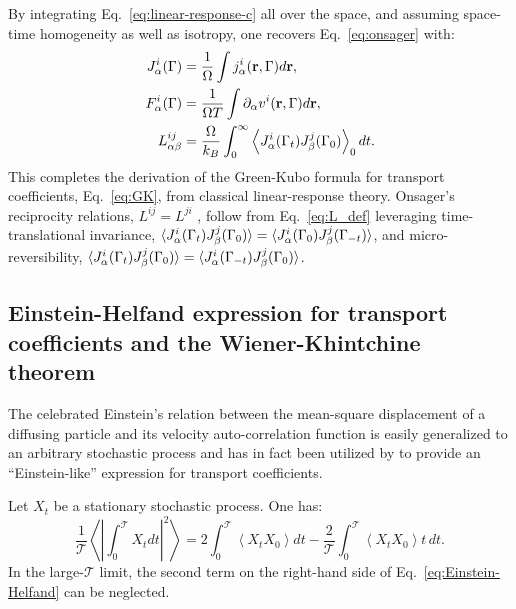 By integrating Eq.~\eqref{eq:linear-response-c} all over the space, and assuming space-time homogeneity as well as isotropy, one recovers Eq.~\eqref{eq:onsager} with:
\begin{align}
J^i_\alpha(\rGamma) &= \frac{1}{\rOmega} \int j^i_\alpha(\mathbf{r},\rGamma) d\mathbf{r}, \label{eq:J_def}\\
F^i_\alpha(\rGamma) &= \frac{1}{\rOmega T} \int \partial_\alpha v^i(\mathbf{r},\rGamma) d\mathbf{r}, \label{eq:F_def}\\
L^{ij}_{\alpha\beta} &= \frac{\rOmega}{k_B} \int_0^\infty \left\langle J^i_\alpha(\rGamma_t) J^j_\beta(\rGamma_0)\right\rangle_0 dt. \label{eq:L_def}
\end{align}
This completes the derivation of the Green-Kubo formula for transport coefficients, Eq.~\eqref{eq:GK}, from classical linear-response theory. Onsager's reciprocity relations, $L^{ij}=L^{ji}$ \citep{Onsager1931a,Onsager1931b}, follow from Eq.~\eqref{eq:L_def} leveraging time-translational invariance, $\langle J^i_\alpha({\mathrm\Gamma}_t) J^j_\beta({\mathrm\Gamma}_0) \rangle = \langle J^i_\alpha({\mathrm\Gamma}_0) J^j_\beta({\mathrm\Gamma}_{-t}) \rangle$, and micro-reversibility, $\langle J^i_\alpha({\mathrm\Gamma}_t) J^j_\beta({\mathrm\Gamma}_0) \rangle = \langle J^i_\alpha({\mathrm\Gamma}_{-t}) J^j_\beta({\mathrm\Gamma}_0) \rangle$.


\subsection{Einstein-Helfand expression for transport coefficients and the Wiener-Khintchine theorem}  \label{sec:Einstein}
The celebrated Einstein's relation between the mean-square displacement of a diffusing particle and its velocity auto-correlation function is easily generalized to an arbitrary stochastic process and has in fact been utilized by \cite{Helfand1960} to provide an ``Einstein-like'' expression for transport coefficients.

Let $X_t$ be a stationary stochastic process. One has:
\begin{equation}
  \frac{1}{\mathcal{T}} \left \langle \left | \int_0^\mathcal{T} X_t dt \right |^2 \right \rangle = 2 \int_0^\mathcal{T} \left \langle X_t X_0 \right \rangle dt -\frac{2}{\mathcal{T}} \int_0^\mathcal{T} \left \langle X_t X_0 \right \rangle t \,dt. \label{eq:Einstein-Helfand}
\end{equation}
In the large-$\mathcal{T}$ limit, the second term on the right-hand side of Eq.~\eqref{eq:Einstein-Helfand} can be neglected.

